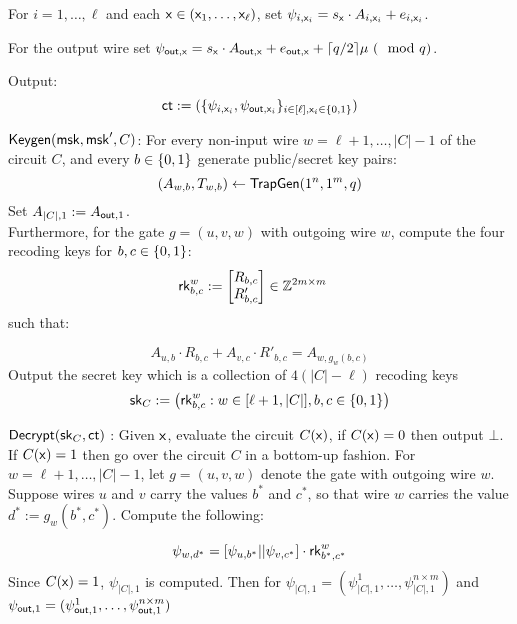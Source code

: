 {%
\item For $i =1,\ldots,\ell$ and each $\mathsf{x}\in(\mathsf{x}_1,\ldots,\mathsf{x}_\ell)$, set $\psi_{i,\mathsf{x}_i}=s_{\mathsf{x}} \cdot A_{i,\mathsf{x}_i}+e_{i,\mathsf{x}_i}$.
\item For the output wire set $\psi_{\mathsf{out},\mathsf{x}}=s_{\mathsf{x}} \cdot A_{\mathsf{out},\mathsf{x}}+e_{\mathsf{out},\mathsf{x}} + \lceil q/2\rceil \mu ~(\mod q)$.


\EI 
Output: 
$$ {\mathsf{ct}}:=(\{\psi_{i,\mathsf{x}_i},\psi_{\mathsf{out},\mathsf{x}_i}\}_{i\in[\ell],\mathsf{x}_i\in\{0,1\}})$$




\item $\mathsf{Keygen}({\mathsf{msk}}, {\mathsf{msk}}', C)$: For every non-input wire $w = \ell+1,\ldots,|C|-1$ of the circuit $C$, and every $b\in\{0,1\}$ generate
public/secret key pairs:
$$ (A_{w,b}, T_{w,b})\leftarrow {\mathsf{TrapGen}}(1^n,1^m,q)$$
Set $A_{|C|,1}:=A_{\mathsf{out},1}$.\\
Furthermore, for the gate $g = (u, v,w)$ with outgoing wire $w$, compute the four recoding keys  for $b,c\in\{0,1\}$: \begin{align*}
    {\mathsf{rk}}^w_{b,c} &:= \begin{bmatrix}
          R_{b,c} \\
          R'_{b,c} \\
         \end{bmatrix} \in \mathbb{Z}^{2m\times m}
  \end{align*}
 such that: 





$$A_{u,b}\cdot R_{b,c}+A_{v,c}\cdot R'_{b,c}=A_{w,g_w(b,c)}$$
Output the secret key which is a collection of $4(|C|-\ell)$ recoding keys
$${\mathsf{sk}}_C := \big({\mathsf{rk}}^w_{b,c}: w\in[\ell+1,|C|],b,c\in\{0,1\} \big)$$


\item $\mathsf{Decrypt}({\mathsf{sk}}_C, {\mathsf{ct}})$ : Given $\mathsf{x}$, evaluate the circuit $C(\mathsf{x})$, if $C(\mathsf{x})= 0$ then output $\bot$. If $C(\mathsf{x})= 1$ then go over the circuit $C$ in a bottom-up fashion. For $w = \ell+1,\ldots,|C|-1$, let
$g = (u, v,w)$ denote the gate with outgoing wire $w$. Suppose wires $u$ and $v$ carry the values $b^*$
and $c^*$, so that wire $w$ carries the value $d^* := g_w(b^*,c^*)$. Compute the following: 

$$\psi_{w,d^*}=[\psi_{u,b^*}||\psi_{v,c^*}]\cdot {\mathsf{rk}}^w_{b^*,c^*}$$
Since $C(\mathsf{x})= 1$, $\psi_{|C|,1}$ is computed. Then for $\psi_{|C|,1}=(\psi_{|C|,1}^1,\ldots,\psi_{|C|,1}^{n\times m})$ and $\psi_{\mathsf{out},1}=(\psi_{\mathsf{out},1}^1,\ldots,\psi_{\mathsf{out},1}^{n\times m})$

}
